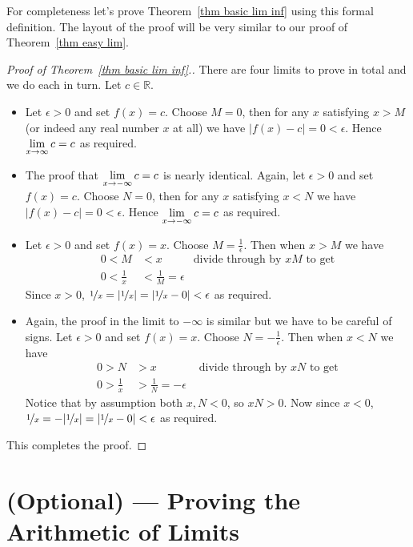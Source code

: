For completeness let's prove Theorem~\ref{thm basic lim inf} using this formal
definition. The layout of the proof will be very similar to our proof of
Theorem~\ref{thm easy lim}.
\begin{proof}[Proof of Theorem~\ref{thm basic lim inf}.]
There are four limits to prove in total and we do each in turn. Let $c \in
\mathbb{R}$.
\begin{itemize}
 \item Let $\epsilon>0$ and set $f(x)=c$. Choose $M=0$, then for any
$x$ satisfying $x>M$ (or indeed any real number $x$ at all) we have
$|f(x)-c| = 0 <\epsilon$. Hence $\displaystyle \lim_{x \to \infty} c = c$ as required.
\item The proof that $\displaystyle \lim_{x \to -\infty} c = c$ is nearly identical.
Again, let $\epsilon>0$ and set $f(x)=c$. Choose $N=0$, then for any
$x$ satisfying $x<N$ we have $|f(x)-c| = 0 <\epsilon$. Hence $\displaystyle \lim_{x \to
-\infty} c = c$ as required.
\item Let $\epsilon>0$ and set $f(x)=x$. Choose $M = \frac{1}{\epsilon}$. Then
when $x>M$ we have
\begin{align*}
  0 < M & < x  & \text{divide through by $xM$ to get}\\
  0 < \frac{1}{x} & < \frac{1}{M} = \epsilon
\end{align*}
Since $x>0$, $\nicefrac{1}{x} = |\nicefrac{1}{x}| = |\nicefrac{1}{x} - 0| <
\epsilon$ as required.

\item Again, the proof in the limit to $-\infty$ is similar but we have to be
careful of signs. Let $\epsilon>0$ and set $f(x)=x$. Choose $N
= -\frac{1}{\epsilon}$. Then when $x< N$ we have
\begin{align*}
  0 > N & > x  &\text{ divide through by $xN$ to get}\\
  0 > \frac{1}{x} &> \frac{1}{N} = -\epsilon
\end{align*}
Notice that by assumption both $x,N<0$, so $xN>0$. Now since $x<0$,
$\nicefrac{1}{x} = -|\nicefrac{1}{x}| = |\nicefrac{1}{x} - 0| < \epsilon$ as
required.
\end{itemize}
This completes the proof.

\end{proof}

\section{(Optional) --- Proving the Arithmetic of Limits}\label{sec proof arith lim}


